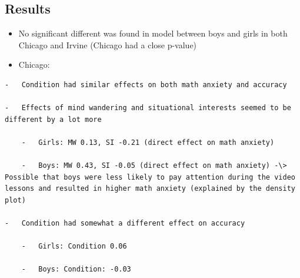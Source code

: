\documentclass[
  letterpaper,
  DIV=11,
  numbers=noendperiod]{scrartcl}
\begin{document}
\hypertarget{results}{%
\subsection{Results}\label{results}}

\begin{itemize}
\item
  No significant different was found in model between boys and girls in
  both Chicago and Irvine (Chicago had a close p-value)
\item
  Chicago:
\end{itemize}

\begin{verbatim}
-   Condition had similar effects on both math anxiety and accuracy

-   Effects of mind wandering and situational interests seemed to be different by a lot more

    -   Girls: MW 0.13, SI -0.21 (direct effect on math anxiety)

    -   Boys: MW 0.43, SI -0.05 (direct effect on math anxiety) -\> Possible that boys were less likely to pay attention during the video lessons and resulted in higher math anxiety (explained by the density plot)

-   Condition had somewhat a different effect on accuracy

    -   Girls: Condition 0.06

    -   Boys: Condition: -0.03
\end{verbatim}
\end{document}
